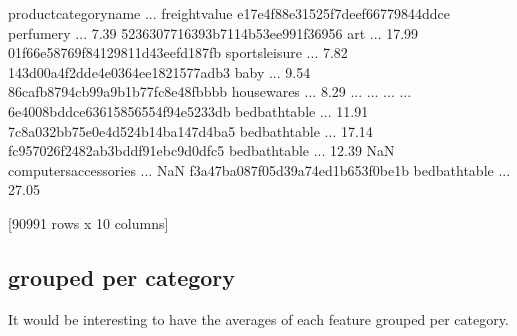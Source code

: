 \documentclass[letterpaper,10pt,english]{jupyterBook}
\begin{document}
\begin{sphinxVerbatim}[commandchars=\\\{\}]
                                  product\PYGZus{}category\PYGZus{}name  ...  freight\PYGZus{}value
e17e4f88e31525f7deef66779844ddce              perfumery  ...           7.39
5236307716393b7114b53ee991f36956                    art  ...          17.99
01f66e58769f84129811d43eefd187fb         sports\PYGZus{}leisure  ...           7.82
143d00a4f2dde4e0364ee1821577adb3                   baby  ...           9.54
86cafb8794cb99a9b1b77fc8e48fbbbb             housewares  ...           8.29
...                                                 ...  ...            ...
6e4008bddce63615856554f94e5233db         bed\PYGZus{}bath\PYGZus{}table  ...          11.91
7c8a032bb75e0e4d524b14ba147d4ba5         bed\PYGZus{}bath\PYGZus{}table  ...          17.14
fc957026f2482ab3bddf91ebc9d0dfc5         bed\PYGZus{}bath\PYGZus{}table  ...          12.39
NaN                               computers\PYGZus{}accessories  ...            NaN
f3a47ba087f05d39a74ed1b653f0be1b         bed\PYGZus{}bath\PYGZus{}table  ...          27.05

[90991 rows x 10 columns]
\end{sphinxVerbatim}


\subsection{grouped per category}
\label{\detokenize{c7_case_studies/Olist:grouped-per-category}}
\sphinxAtStartPar
It would be interesting to have the averages of each feature grouped per category.

\begin{sphinxVerbatim}[commandchars=\\\{\}]
  
\end{sphinxVerbatim}
\end{document}
